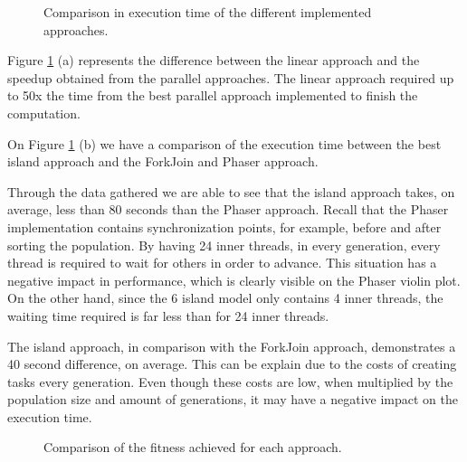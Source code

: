\documentclass[runningheads]{llncs}
\begin{document}
\begin{figure}[H]
\centering
{}%
\qquad
{}%
\caption{Comparison in execution time of the different implemented approaches.} \label{comparacaolinear}
\label{comparacaoImpl}%
\end{figure}

Figure \ref{comparacaoImpl} (a) represents the difference between the linear approach and the speedup obtained from the parallel approaches. The linear approach required up to 50x the time from the best parallel approach implemented to finish the computation.

On Figure \ref{comparacaoImpl} (b) we have a comparison of the execution time between the best island approach and the ForkJoin and Phaser approach.

Through the data gathered we are able to see that the island approach takes, on average, less than 80 seconds than the Phaser approach. Recall that the Phaser implementation contains synchronization points, for example, before and after sorting the population. By having 24 inner threads, in every generation, every thread is required to wait for others in order to advance. This situation has a negative impact in performance, which is clearly visible on the Phaser violin plot. On the other hand, since the 6 island model only contains 4 inner threads, the waiting time required is far less than for 24 inner threads.

The island approach, in comparison with the ForkJoin approach, demonstrates a 40 second difference, on average. This can be explain due to the costs of creating tasks every generation. Even though these costs are low, when multiplied by the population size and amount of generations, it may have a negative impact on the execution time.



\begin{figure}[H]
\centering
{}
\caption{Comparison of the fitness achieved for each approach.} \label{comparacaofitness}
\end{figure}
\end{document}
